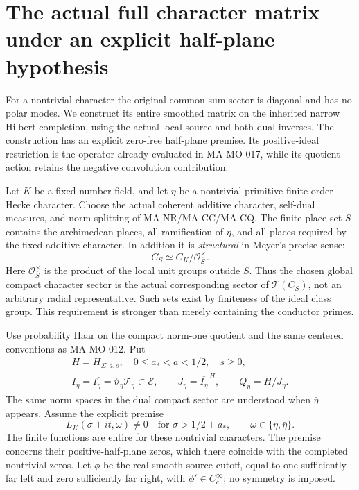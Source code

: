 \section{The actual full character matrix under an explicit half-plane hypothesis}
\label{sec:character-common-matrix}

For a nontrivial character the original common-sum sector is
diagonal and has no polar modes. We construct its entire
smoothed matrix on the inherited narrow Hilbert completion,
using the actual local source and both dual inverses. The
construction has an explicit zero-free half-plane premise.
Its positive-ideal restriction is the operator already
evaluated in MA-MO-017, while its quotient action retains
the negative convolution contribution.

Let \(K\) be a fixed number field, and let \(\eta\) be a
nontrivial primitive finite-order Hecke character. Choose the
actual coherent additive character, self-dual measures, and
norm splitting of MA-NR/MA-CC/MA-CQ. The finite place set
\(S\) contains the archimedean places, all ramification of
\(\eta\), and all places required by the fixed additive
character. In addition it is \emph{structural} in Meyer's
precise sense:
\[
      C_S\simeq C_K/\mathcal O_{\overline S}^{\times}.
 \tag{MA-MO.470}
\]
Here \(\mathcal O_{\overline S}^{\times}\) is the product
of the local unit groups outside \(S\). Thus the chosen
global compact character sector is the actual corresponding
sector of \(\mathcal T(C_S)\), not an arbitrary radial
representative. Such sets exist by finiteness of the ideal
class group. This requirement is stronger than merely
containing the conductor primes.

Use probability Haar on the compact norm-one quotient and
the same centered conventions as MA-MO-012. Put
\[
 \begin{gathered}
 H=H_{\Sigma,a,s},\quad 0\le a_*<a<1/2,\quad s\ge0,\\
 I_\eta=I_\eta^c=\vartheta_\eta\mathcal T_\eta\subset\mathcal E,
 \qquad J_\eta=\overline{I_\eta}^{\,H},\qquad Q_\eta=H/J_\eta.
 \end{gathered}
 \tag{MA-MO.471}
\]
The same norm spaces in the dual compact sector are understood
when \(\bar\eta\) appears. Assume the explicit premise
\[
 L_K(\sigma+it,\omega)\ne0
       \quad\text{for }\sigma>1/2+a_*,
             \qquad \omega\in\{\eta,\bar\eta\}.
 \tag{MA-MO.472}
\]
The finite functions are entire for these nontrivial characters.
The premise concerns their positive-half-plane zeros, which
there coincide with the completed nontrivial zeros.
Let \(\phi\) be the real smooth source cutoff, equal to one
sufficiently far left and zero sufficiently far right, with
\(\phi'\in C_c^\infty\); no symmetry is imposed.

